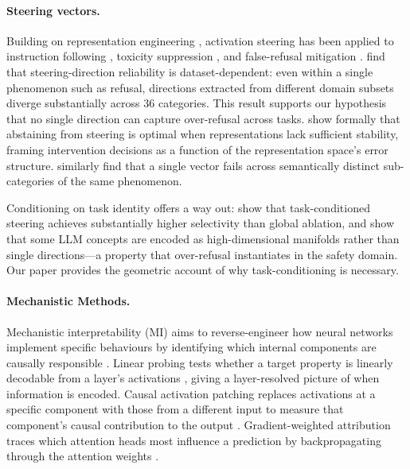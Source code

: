 \documentclass[11pt]{article}
\begin{document}
\paragraph{Steering vectors.}
Building on representation engineering \citep{zou2023representation,panickssery2023steering},
activation steering has been applied to instruction following \citep{stolfo2025instruction},
toxicity suppression \citep{suau2024toxicity}, and false-refusal mitigation
\citep{wangf2025refusal}.
\citet{braun2025unreliability} find that steering-direction reliability is
dataset-dependent: even within a single phenomenon such as refusal, directions
extracted from different domain subsets diverge substantially across 36 categories.
This result supports our hypothesis that no single direction can capture over-refusal
across tasks.
\citet{hedstrom2025steer} show formally that abstaining from steering is optimal
when representations lack sufficient stability, framing intervention decisions as
a function of the representation space's error structure.
\citet{wang2025adaptive} similarly find that a single vector fails across semantically
distinct sub-categories of the same phenomenon.


Conditioning on task identity offers a way out: \citet{safeconstellations2025}
show that task-conditioned steering achieves substantially higher selectivity
than global ablation, and \citet{engels2025nonlinear} show that some LLM concepts
are encoded as high-dimensional manifolds rather than single directions---a
property that over-refusal instantiates in the safety domain.
Our paper provides the geometric account of why task-conditioning is necessary.

\paragraph{Mechanistic Methods.}
Mechanistic interpretability (MI) aims to reverse-engineer how neural networks
implement specific behaviours by identifying which internal components are
causally responsible \citep{zhang2026locate}.
Linear probing tests whether a target property is linearly decodable from a
layer's activations \citep{marks2023geometry,park2023linear}, giving a
layer-resolved picture of when information is encoded.
Causal activation patching replaces activations at a specific component with
those from a different input to measure that component's causal contribution
to the output \citep{meng2022locating,conmy2023automated}.
Gradient-weighted attribution traces which attention heads most influence a
prediction by backpropagating through the attention weights \citep{syed2023attribution}.
\end{document}

